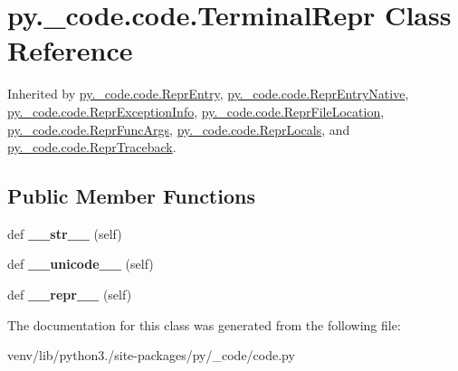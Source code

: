 \hypertarget{classpy_1_1__code_1_1code_1_1_terminal_repr}{}\section{py.\+\_\+code.\+code.\+Terminal\+Repr Class Reference}
\label{classpy_1_1__code_1_1code_1_1_terminal_repr}


Inherited by \hyperlink{classpy_1_1__code_1_1code_1_1_repr_entry}{py.\+\_\+code.\+code.\+Repr\+Entry}, \hyperlink{classpy_1_1__code_1_1code_1_1_repr_entry_native}{py.\+\_\+code.\+code.\+Repr\+Entry\+Native}, \hyperlink{classpy_1_1__code_1_1code_1_1_repr_exception_info}{py.\+\_\+code.\+code.\+Repr\+Exception\+Info}, \hyperlink{classpy_1_1__code_1_1code_1_1_repr_file_location}{py.\+\_\+code.\+code.\+Repr\+File\+Location}, \hyperlink{classpy_1_1__code_1_1code_1_1_repr_func_args}{py.\+\_\+code.\+code.\+Repr\+Func\+Args}, \hyperlink{classpy_1_1__code_1_1code_1_1_repr_locals}{py.\+\_\+code.\+code.\+Repr\+Locals}, and \hyperlink{classpy_1_1__code_1_1code_1_1_repr_traceback}{py.\+\_\+code.\+code.\+Repr\+Traceback}.

\subsection*{Public Member Functions}
\begin{DoxyCompactItemize}
\item 
\mbox{\label{classpy_1_1__code_1_1code_1_1_terminal_repr_af204edde3b42ea488422eb1498d1fdc9}} 
def {\bfseries \+\_\+\+\_\+str\+\_\+\+\_\+} (self)
\item 
\mbox{\label{classpy_1_1__code_1_1code_1_1_terminal_repr_a0e25928a8a73b30b076845aaaa57af26}} 
def {\bfseries \+\_\+\+\_\+unicode\+\_\+\+\_\+} (self)
\item 
\mbox{\label{classpy_1_1__code_1_1code_1_1_terminal_repr_aac00fd5e3451cba90cb3e2b113e6d588}} 
def {\bfseries \+\_\+\+\_\+repr\+\_\+\+\_\+} (self)
\end{DoxyCompactItemize}


The documentation for this class was generated from the following file\+:\begin{DoxyCompactItemize}
\item 
venv/lib/python3./site-\/packages/py/\+\_\+code/code.\+py\end{DoxyCompactItemize}
